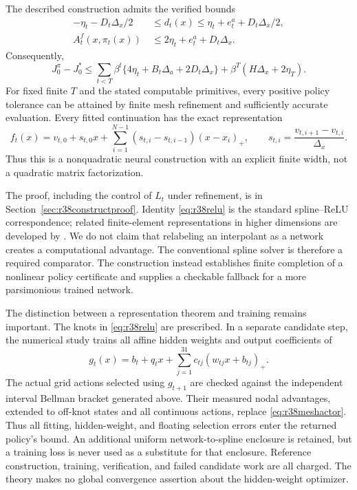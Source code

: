 \begin{theorem}
\label{thm:r38construct}
The described construction admits the verified bounds
\begin{align}
 -\eta_t-D_t\Delta_x/2\ &\leq d_t(x)
        \leq\eta_t+e_t^a+D_t\Delta_x/2,\label{eq:r38meshres}\\
 A_t^f(x,\pi_t(x))\ &\leq2\eta_t+e_t^a+D_t\Delta_x.\label{eq:r38meshactor}
\end{align}
Consequently,
\begin{equation}\label{eq:r38meshpolicy}
 J_0^\pi-J_0^*\leq
 \sum_{t<T}\beta^t\{4\eta_t+B_t\Delta_a+2D_t\Delta_x\}
       +\beta^T(H\Delta_x+2\eta_T).
\end{equation}
For fixed finite $T$ and the stated computable primitives, every positive
policy tolerance can be attained by finite mesh refinement and sufficiently
accurate evaluation. Every fitted continuation has the exact representation
\begin{equation}\label{eq:r38relu}
 f_t(x)=v_{t,0}+s_{t,0}x+
     \sum_{i=1}^{N-1}(s_{t,i}-s_{t,i-1})(x-x_i)_+,
 \qquad s_{t,i}=\frac{v_{t,i+1}-v_{t,i}}{\Delta_x}.
\end{equation}
Thus this is a nonquadratic neural construction with an explicit finite
width, not a quadratic matrix factorization.
\end{theorem}

The proof, including the control of $L_t$ under refinement, is in
Section~\ref{sec:r38constructproof}. Identity \eqref{eq:r38relu} is the
standard spline--ReLU correspondence; related finite-element
representations in higher dimensions are developed by
\citet{r38he2018}. We do not claim that relabeling an interpolant as a
network creates a computational advantage. The conventional spline solver
is therefore a required comparator. The construction instead establishes
finite completion of a nonlinear policy certificate and supplies a
checkable fallback for a more parsimonious trained network.

The distinction between a representation theorem and training remains
important. The knots in \eqref{eq:r38relu} are prescribed. In a separate
candidate step, the numerical study trains all affine hidden weights and
output coefficients of
\[
 g_t(x)=b_t+q_tx+\sum_{j=1}^{31}c_{tj}(w_{tj}x+b_{tj})_+.
\]
The actual grid actions selected using $g_{t+1}$ are checked against the
independent interval Bellman bracket generated above. Their measured nodal
advantages, extended to off-knot states and all continuous actions, replace
\eqref{eq:r38meshactor}. Thus all fitting, hidden-weight, and floating
selection errors enter the returned policy's bound. An additional uniform
network-to-spline enclosure is retained, but a training loss is never used
as a substitute for that enclosure. Reference construction, training,
verification, and failed candidate work are all charged. The theory makes
no global convergence assertion about the hidden-weight optimizer.


